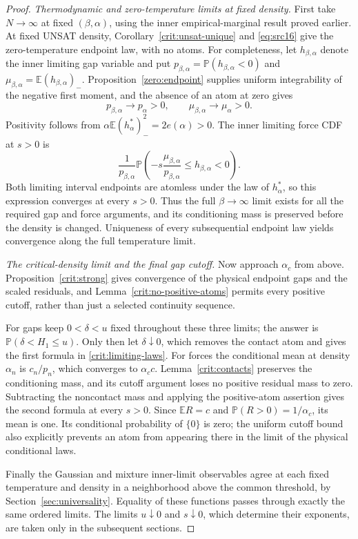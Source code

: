 \documentclass[11pt,a4paper]{article}
\numberwithin{equation}{section}
\theoremstyle{definition}
\theoremstyle{remark}
\newcommand{\E}{\mathbb E}
\newcommand{\Prob}{\mathbb P}
\begin{document}
\begin{proof}
\emph{Thermodynamic and zero-temperature limits at fixed density.}
First take $N\to\infty$ at fixed $(\beta,\alpha)$, using the inner
empirical-marginal result proved earlier.  At fixed UNSAT density,
Corollary~\ref{crit:unsat-unique} and \eqref{eq:src16} give the
zero-temperature endpoint law, with no atoms.  For completeness,
let $h_{\beta,\alpha}$ denote the inner limiting gap variable and put
$p_{\beta,\alpha}=\Prob(h_{\beta,\alpha}<0)$ and
$\mu_{\beta,\alpha}=\E(h_{\beta,\alpha})_-$.
Proposition~\ref{zero:endpoint} supplies uniform integrability of
the negative first moment, and the absence of an atom at zero gives
\[
 p_{\beta,\alpha}\longrightarrow p_\alpha>0,\qquad
 \mu_{\beta,\alpha}\longrightarrow\mu_\alpha>0.
\]
Positivity follows from
$\alpha\E(h_\alpha^*)_-^2=2e(\alpha)>0$.
The inner limiting force CDF at $s>0$ is
\[
 \frac1{p_{\beta,\alpha}}
 \Prob\left(-s\frac{\mu_{\beta,\alpha}}{p_{\beta,\alpha}}
                          \le h_{\beta,\alpha}<0\right).
\]
Both limiting interval endpoints are atomless under the law of
$h_\alpha^*$, so this expression converges at every $s>0$.
Thus the full $\beta\to\infty$ limit exists for all the required
gap and force arguments, and its conditioning mass is preserved
before the density is changed.  Uniqueness of every subsequential
endpoint law yields convergence along the full temperature limit.

\emph{The critical-density limit and the final gap cutoff.}
Now approach $\alpha_c$ from above. Proposition~\ref{crit:strong}
gives convergence of the physical endpoint gaps and the scaled
residuals, and Lemma~\ref{crit:no-positive-atoms} permits every positive
cutoff, rather than just a selected continuity sequence.

For gaps keep $0<\delta<u$ fixed throughout these three limits;
the answer is $\Prob(\delta<H_1\le u)$.  Only then let
$\delta\downarrow0$, which removes the contact atom and gives the
first formula in \eqref{crit:limiting-laws}.
For forces the conditional mean at density $\alpha_n$ is $c_n/p_n$,
which converges to $\alpha_cc$.  Lemma~\ref{crit:contacts} preserves
the conditioning mass, and its cutoff argument loses no positive
residual mass to zero.  Subtracting the noncontact mass and applying
the positive-atom assertion gives the second formula at every $s>0$.
Since $\E R=c$ and $\Prob(R>0)=1/\alpha_c$, its mean is one.
Its conditional probability of $\{0\}$ is zero; the uniform cutoff
bound also explicitly prevents an atom from appearing there in
the limit of the physical conditional laws.

Finally the Gaussian and mixture inner-limit observables agree at
each fixed temperature and density in a neighborhood above the common
threshold, by Section~\ref{sec:universality}.  Equality of these
functions passes through exactly the same ordered limits.
The limits $u\downarrow0$ and $s\downarrow0$, which determine their
exponents, are taken only in the subsequent sections.
\end{proof}
\end{document}
